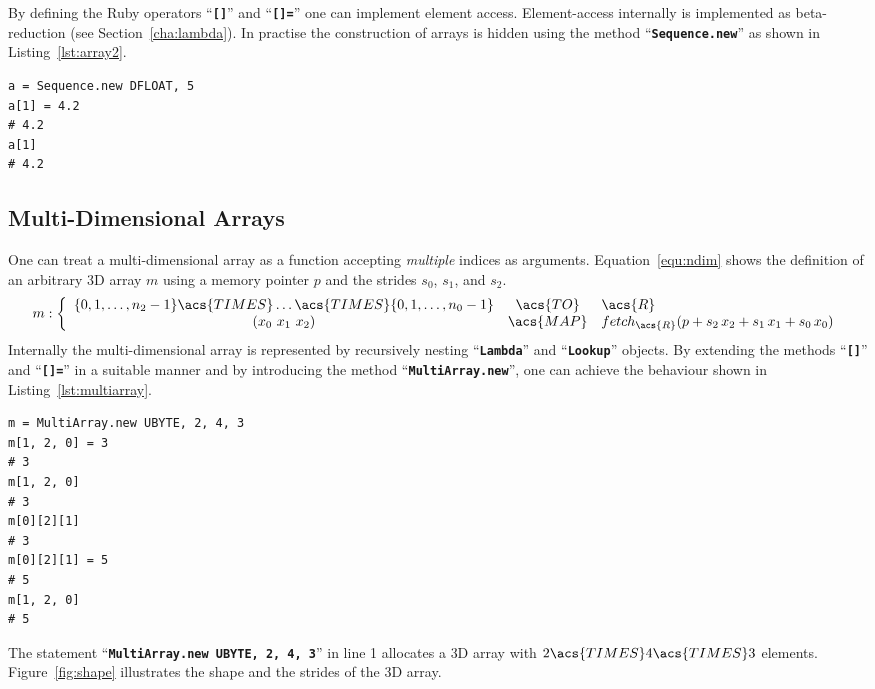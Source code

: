 \documentclass[12pt,a4paper,oneside,openright]{book}
\newcommand{\sct}[1]{Section~\ref{cha:#1}}
\newcommand{\equ}[1]{Equation~\ref{equ:#1}}
\newcommand{\fig}[1]{Figure~\ref{fig:#1}}
\newcommand{\lst}[1]{Listing~\ref{lst:#1}}
\newcommand{\code}[1]{``\texttt{\textbf{\textcolor{codegray}{\small{#1}}}}''}
\begin{document}
\begin{CJK}{UTF8}{}
By defining the Ruby operators \code{[]} and \code{[]=} one can implement element access. Element-access internally is implemented as beta-reduction (see \sct{lambda}). In practise the construction of arrays is hidden using the method \code{Sequence.new} as shown in \lst{array2}.
\lstset{language=Ruby,frame=single,numbers=none}
\begin{lstlisting}[float=htbp,caption={Uniform arrays},escapechar=\$,label=lst:array2]
a = Sequence.new DFLOAT, 5
a[1] = 4.2
# 4.2
a[1]
# 4.2
\end{lstlisting}

\subsection{Multi-Dimensional Arrays}\label{cha:multiarray}
One can treat a multi-dimensional array as a function accepting \emph{multiple} indices as arguments. \equ{ndim} shows the definition of an arbitrary \ac{3D} array $m$ using a memory pointer $p$ and the strides $s_0$, $s_1$, and $s_2$.
\begin{equation}\label{equ:ndim}
  m:\left\{\begin{array}{ccl}\{0,1,\ldots,n_2-1\}\acs{TIMES}\ldots\acs{TIMES}\{0,1,\ldots,n_0-1\}&\acs{TO}&\acs{R}\\(x_0\ x_1\ x_2)&\acs{MAP}&fetch_{\acs{R}}(p+s_2\,x_2+s_1\,x_1+s_0\,x_0)\end{array}\right.
\end{equation}
Internally the multi-dimensional array is represented by recursively nesting \code{Lambda} and \code{Lookup} objects. By extending the methods \code{[]} and \code{[]=} in a suitable manner and by introducing the method \code{MultiArray.new}, one can achieve the behaviour shown in \lst{multiarray}.
\lstset{language=Ruby,frame=single,numbers=left}
\begin{lstlisting}[float=htbp,caption={Multi-dimensional uniform arrays},escapechar=\$,label=lst:multiarray]
m = MultiArray.new UBYTE, 2, 4, 3
m[1, 2, 0] = 3
# 3
m[1, 2, 0]
# 3
m[0][2][1]
# 3
m[0][2][1] = 5
# 5
m[1, 2, 0]
# 5
\end{lstlisting}
The statement \code{MultiArray.new UBYTE, 2, 4, 3} in line 1 allocates a \ac{3D} array with $2\acs{TIMES} 4\acs{TIMES} 3$ elements. \fig{shape} illustrates the shape and the strides of the \ac{3D} array.
\begin{figure}[t]
  \begin{center}
    \begin{minipage}[c]{.22\textwidth}
      \begin{center}

\end{center}
\end{minipage}
\end{center}
\end{figure}
\end{CJK}
\end{document}
